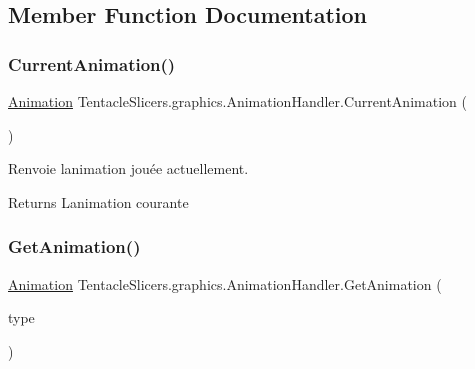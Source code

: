 \subsection{Member Function Documentation}
\mbox{\label{class_tentacle_slicers_1_1graphics_1_1_animation_handler_a7517212410c75974b516371e74023874}} 
\subsubsection{\texorpdfstring{Current\+Animation()}{CurrentAnimation()}}
{\footnotesize\ttfamily \hyperlink{class_tentacle_slicers_1_1graphics_1_1_animation}{Animation} Tentacle\+Slicers.\+graphics.\+Animation\+Handler.\+Current\+Animation (\begin{DoxyParamCaption}{ }\end{DoxyParamCaption})}



Renvoie l\textquotesingle{}animation jouée actuellement. 

\begin{DoxyReturn}{Returns}
L\textquotesingle{}animation courante 
\end{DoxyReturn}
\mbox{\label{class_tentacle_slicers_1_1graphics_1_1_animation_handler_a9689c8aa6eda698f6c70f2d4722d2f67}} 
\subsubsection{\texorpdfstring{Get\+Animation()}{GetAnimation()}}
{\footnotesize\ttfamily \hyperlink{class_tentacle_slicers_1_1graphics_1_1_animation}{Animation} Tentacle\+Slicers.\+graphics.\+Animation\+Handler.\+Get\+Animation (\begin{DoxyParamCaption}\item[{\hyperlink{namespace_tentacle_slicers_1_1graphics_a9c92bd633d714099730f10897a01950b}{Animation\+Type}}]{type }\end{DoxyParamCaption})}



